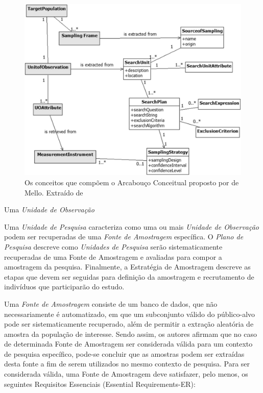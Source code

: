 \begin{figure}[htpb]
	\centering
	\includegraphics[width=0.8\linewidth]{./chapter-pesquisa-com-profissionais/img/framework-amostragem.png}
	\caption{Os conceitos que compõem o Arcabouço Conceitual proposto por de
		Mello. Extraído de~\cite{de2015investigating}}
\label{fig:framework-amostragem}
\end{figure}


Uma \textit{Unidade de Observação}~\cite{wohlin2012experimentation}

Uma \textit{Unidade de Pesquisa} caracteriza como uma ou mais \textit{Unidade de
	Observação} podem ser recuperadas de uma \textit{Fonte de Amostragem}
específica. O \textit{Plano de Pesquisa} descreve como \textit{Unidades de
	Pesquisa} serão sistematicamente recuperadas de uma Fonte de Amostragem e
avaliadas para compor a amostragem da pesquisa. Finalmente, a Estratégia de
Amostragem descreve as etapas que devem ser seguidas para definição da
amostragem e recrutamento de indivíduos que participarão do estudo.

Uma \textit{Fonte de Amostragem} consiste de um banco de dados, que não
necessariamente é automatizado, em que um subconjunto válido do público-alvo
pode ser sistematicamente recuperado, além de permitir a extração aleatória de
amostra da população de interesse. Sendo assim, os autores afirmam que no caso
de determinada Fonte de Amostragem ser considerada válida para um contexto de
pesquisa específico, pode-se concluir que as amostras podem ser extraídas desta
fonte a fim de serem utilizados no mesmo contexto de pesquisa. Para ser
considerada válida, uma Fonte de Amostragem deve satisfazer, pelo menos, os
seguintes Requisitos Essenciais (Essential Requirements\@-\@ ER):

